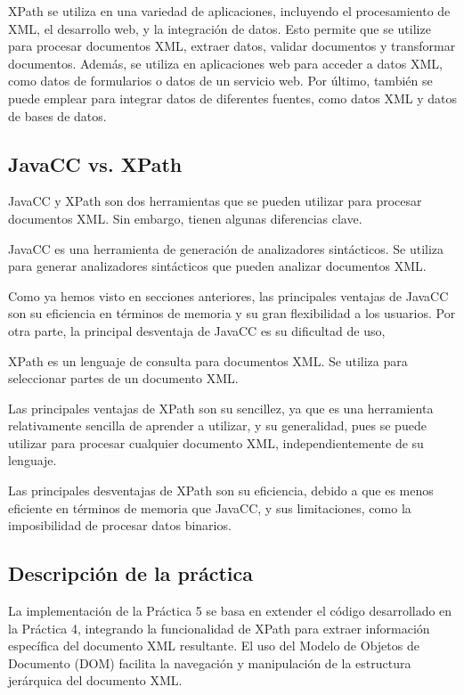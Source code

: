 XPath se utiliza en una variedad de aplicaciones, incluyendo el procesamiento de XML, el desarrollo web, y la integración de datos. Esto permite que se utilize para procesar documentos XML, extraer datos, validar documentos y transformar documentos. Además, se utiliza en aplicaciones web para acceder a datos XML, como datos de formularios o datos de un servicio web. Por último, también se puede emplear para integrar datos de diferentes fuentes, como datos XML y datos de bases de datos.

\subsection{JavaCC vs. XPath}

\noindent JavaCC y XPath son dos herramientas que se pueden utilizar para procesar documentos XML. Sin embargo, tienen algunas diferencias clave.

JavaCC es una herramienta de generación de analizadores sintácticos. Se utiliza para generar analizadores sintácticos que pueden analizar documentos XML.

Como ya hemos visto en secciones anteriores, las principales ventajas de JavaCC son su eficiencia en términos de memoria y su gran flexibilidad a los usuarios. Por otra parte, la principal desventaja de JavaCC es su dificultad de uso,

XPath es un lenguaje de consulta para documentos XML. Se utiliza para seleccionar partes de un documento XML.

Las principales ventajas de XPath son su sencillez, ya que es una herramienta relativamente sencilla de aprender a utilizar, y su generalidad, pues se puede utilizar para procesar cualquier documento XML, independientemente de su lenguaje.

Las principales desventajas de XPath son su eficiencia, debido a que es menos eficiente en términos de memoria que JavaCC, y sus limitaciones, como la imposibilidad de procesar datos binarios.


\subsection{Descripción de la práctica}

\noindent La implementación de la Práctica 5 se basa en extender el código desarrollado en la Práctica 4, integrando la funcionalidad de XPath para extraer información específica del documento XML resultante. El uso del Modelo de Objetos de Documento (DOM) facilita la navegación y manipulación de la estructura jerárquica del documento XML.

